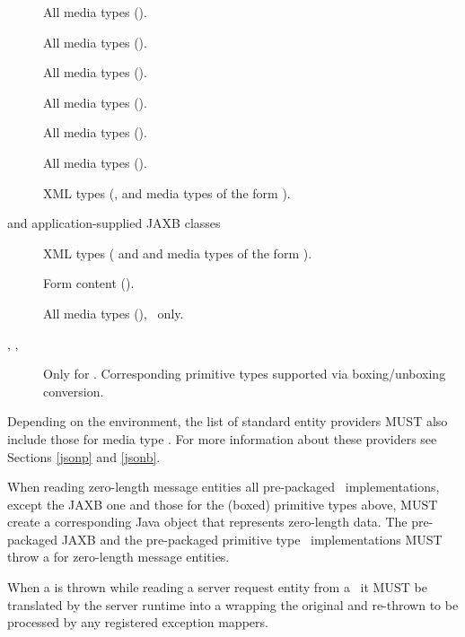 \begin{description}
\item[] All media types (\code{*/*}).
\item[] All media types (\code{*/*}).
\item[] All media types (\code{*/*}).
\item[] All media types (\code{*/*}).
\item[] All media types (\code{*/*}).
\item[] All media types (\code{*/*}).
\item[] XML types (,  and media types of the form ).
\item[ and application-supplied JAXB classes] XML types ( and  and media 
types of the form ).
\item[] Form content ().
\item[] All media types (\code{*/*}), \MsgWrite\ only.
\item[, ,  \label{primitive_types}] Only for . Corresponding primitive types supported via boxing/unboxing conversion.
\end{description}

Depending on the environment, the list of standard entity providers MUST also include those for media type . For more information about these providers see Sections \ref{jsonp} and \ref{jsonb}.

When reading zero-length message entities all pre-packaged \MsgRead\ implementations, except the JAXB one and those for the (boxed) primitive types above, MUST create a corresponding Java object that represents zero-length data. The pre-packaged JAXB and the pre-packaged primitive type \MsgRead\ implementations MUST throw a  for zero-length message entities. 

When a  is thrown while reading a server request entity from a \MsgRead\, it MUST be translated by the server runtime into a  wrapping the original  and re-thrown to be processed by any registered exception mappers.

